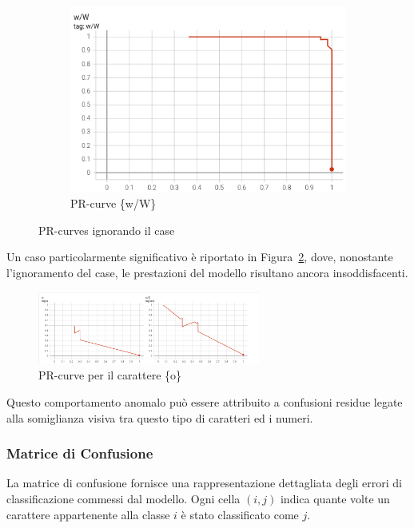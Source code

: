 \begin{figure}[htbp]
\begin{subfigure}[t]{0.30\textwidth}
    \end{subfigure}
    \begin{subfigure}[t]{0.30\textwidth}
        \centering
        \includegraphics[width=\textwidth]{images/pr_ignore3.png}
        \caption{PR-curve \{w/W\}}
    \end{subfigure}
    \caption{PR-curves ignorando il case}
    \label{fig:pr-ignore}
\end{figure}
\FloatBarrier
Un caso particolarmente significativo è riportato in Figura~\ref{fig:pr_strange}, dove, nonostante l'ignoramento del case, le prestazioni del modello risultano ancora insoddisfacenti.

\begin{figure}[htbp]
    \centering
    \includegraphics[width=0.65\textwidth]{images/pr_strange.png}
    \caption{PR-curve per il carattere \{o\}}
    \label{fig:pr_strange}
\end{figure}

Questo comportamento anomalo può essere attribuito a confusioni residue legate alla somiglianza visiva tra questo tipo di caratteri ed i numeri.

\subsubsection*{Matrice di Confusione}
La matrice di confusione fornisce una rappresentazione dettagliata degli errori di classificazione commessi dal modello. Ogni cella \((i, j)\) indica quante volte un carattere appartenente alla classe \(i\) è stato classificato come \(j\).

